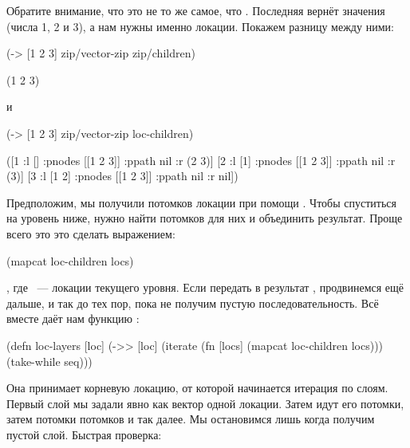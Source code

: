 Обратите внимание, что это не то же самое, что . Последняя
вернёт значения (числа 1, 2 и 3), а нам нужны именно локации. Покажем разницу
между ними:

\begin{english}
  \begin{clojure}
(-> [1 2 3]
    zip/vector-zip
    zip/children)

(1 2 3)
  \end{clojure}
\end{english}

\noindent
и

\begin{english}
  \begin{clojure}
(-> [1 2 3]
    zip/vector-zip
    loc-children)

([1 {:l [] :pnodes [[1 2 3]] :ppath nil :r (2 3)}]
 [2 {:l [1] :pnodes [[1 2 3]] :ppath nil :r (3)}]
 [3 {:l [1 2] :pnodes [[1 2 3]] :ppath nil :r nil}])
  \end{clojure}
\end{english}

Предположим, мы получили потомков локации при помощи .  Чтобы
спуститься на уровень ниже, нужно найти потомков для них и объединить
результат. Проще всего это это сделать выражением:

\begin{english}
  \begin{clojure}
(mapcat loc-children locs)
  \end{clojure}
\end{english}

\noindent
, где ~--- локации текущего уровня. Если передать в  результат
, продвинемся ещё дальше, и так до тех пор, пока не получим пустую
последовательность. Всё вместе даёт нам функцию :

\begin{english}
  \begin{clojure}
(defn loc-layers [loc]
  (->> [loc]
       (iterate (fn [locs]
                  (mapcat loc-children locs)))
       (take-while seq)))
  \end{clojure}
\end{english}

Она принимает корневую локацию, от которой начинается итерация по слоям. Первый
слой мы задали явно как вектор одной локации. Затем идут его потомки, затем
потомки потомков и так далее. Мы остановимся лишь когда получим пустой
слой. Быстрая проверка:

